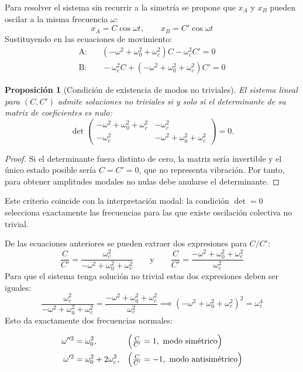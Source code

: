 \documentclass[12pt, a4paper]{article}
\theoremstyle{plain}
\newtheorem{proposicion}[teorema]{Proposición}
\theoremstyle{definition}
\theoremstyle{remark}
\begin{document}
Para resolver el sistema sin recurrir a la simetría se propone que $x_A$ y $x_B$ pueden
oscilar a la misma frecuencia $\omega$:
\begin{equation}
  x_A = C\cos\omega t,\qquad x_B = C'\cos\omega t
\end{equation}
Sustituyendo en las ecuaciones de movimiento:
\begin{align}
  \text{A:}&\quad (-\omega^2+\omega_0^2+\omega_c^2)C - \omega_c^2 C' = 0
  \label{eq:anaA}\\
  \text{B:}&\quad -\omega_c^2 C + (-\omega^2+\omega_0^2+\omega_c^2)C' = 0
  \label{eq:anaB}
\end{align}
\begin{proposicion}[Condición de existencia de modos no triviales]
El sistema lineal para $(C,C')$ admite soluciones no triviales si y solo si el
determinante de su matriz de coeficientes es nulo:
\[
  \det
  \begin{pmatrix}
    -\omega^2+\omega_0^2+\omega_c^2 & -\omega_c^2\\
    -\omega_c^2 & -\omega^2+\omega_0^2+\omega_c^2
  \end{pmatrix}=0.
\]
\end{proposicion}

\begin{proof}
Si el determinante fuera distinto de cero, la matriz sería invertible y el único estado
posible sería $C=C'=0$, que no representa vibración. Por tanto, para obtener amplitudes
modales no nulas debe anularse el determinante.
\end{proof}
Este criterio coincide con la interpretación modal: la condición $\det=0$ selecciona
exactamente las frecuencias para las que existe oscilación colectiva no trivial.

De las ecuaciones anteriores se pueden extraer dos expresiones para $C/C'$:
\begin{equation}
  \frac{C}{C'} = \frac{\omega_c^2}{-\omega^2+\omega_0^2+\omega_c^2}
  \qquad\text{y}\qquad
  \frac{C}{C'} = \frac{-\omega^2+\omega_0^2+\omega_c^2}{\omega_c^2}
\end{equation}
Para que el sistema tenga solución no trivial estas dos expresiones deben ser iguales:
\begin{equation}
  \frac{\omega_c^2}{-\omega^2+\omega_0^2+\omega_c^2}
  = \frac{-\omega^2+\omega_0^2+\omega_c^2}{\omega_c^2}
  \implies
  \left(-\omega^2+\omega_0^2+\omega_c^2\right)^2 = \omega_c^4
\end{equation}
Esto da exactamente dos frecuencias normales:
\begin{mdframed}[style=resultado]
\begin{align}
  \omega''^2 &= \omega_0^2,
  &&\Bigl(\tfrac{C}{C'}=1,\ \text{modo simétrico}\Bigr)\\
  \omega'^2  &= \omega_0^2 + 2\omega_c^2,
  &&\Bigl(\tfrac{C}{C'}=-1,\ \text{modo antisimétrico}\Bigr)
\end{align}
\end{mdframed}
\end{document}
